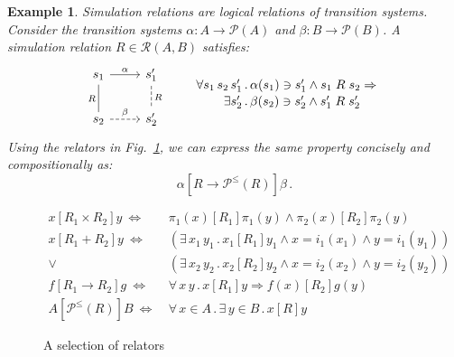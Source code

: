 \documentclass[draft,11pt]{report}
\newtheorem{example}{Example}
\newcommand{\ifr}[1]{\mathrel{[{#1}]}}
\newcommand{\figsize}{}
\begin{document}
\begin{example} \label{ex:simrel} %
Simulation relations are
logical relations of transition systems.
Consider the transition systems
$\alpha : A \rightarrow \mathcal{P}(A)$ and
$\beta : B \rightarrow \mathcal{P}(B)$.
A simulation relation $R \in \mathcal{R}(A, B)$
satisfies:
\[
  \begin{tikzcd}[scale=0.8]
    s_1 \arrow[r, "\alpha"]
        \arrow[d, dash, "R"'] &
    s_1' \arrow[d, dashed, dash, "R"] \\
    s_2 \arrow[r, dashed, "\beta"] &
    s_2'
  \end{tikzcd}
  \qquad
  \label{eqn:simrel}
  \begin{array}{r@{\,.\,}l}
    \forall s_1 \, s_2 \, s_1' &
      \alpha(s_1) \ni s_1' \wedge s_1 \mathrel{R} s_2 \Rightarrow
    \\[0.25ex]
    \exists s_2' &
      \beta(s_2) \ni s_2' \wedge s_1' \mathrel{R} s_2'
  \end{array}
\]
Using the relators in Fig.~\ref{fig:relators},
we can express the same property
concisely and compositionally as:
\[
  \alpha \ifr{R \rightarrow \mathcal{P}^\le(R)} \beta \,.
\]
\end{example}

\begin{figure} %
  \figsize
  \begin{align*}
    x \ifr{R_1 \times R_2} y \ \Leftrightarrow\  &
      \pi_1(x) \ifr{R_1} \pi_1(y) \wedge
      \pi_2(x) \ifr{R_2} \pi_2(y) \\
    x \ifr{R_1 + R_2} y \ \Leftrightarrow\  &
      (\exists \, x_1 \, y_1 \,.\,
        x_1 \ifr{R_1} y_1 \wedge
        x = i_1(x_1) \wedge
        y = i_1(y_1)) \\ \vee\ &
      (\exists \, x_2 \, y_2 \,.\,
        x_2 \ifr{R_2} y_2 \wedge
        x = i_2(x_2) \wedge
        y = i_2(y_2)) \\
    f \ifr{R_1 \rightarrow R_2} g \ \Leftrightarrow\  &
      \forall \, x \, y \,.\,
        x \ifr{R_1} y \Rightarrow
        f(x) \ifr{R_2} g(y) \\
    A \ifr{\mathcal{P}^\le(R)} B \ \Leftrightarrow\  &
      \forall \, x \in A \,.\,
      \exists \, y \in B \,.\,
      x \ifr{R} y
  \end{align*}
  \caption{A selection of relators}
  \label{fig:relators}
\end{figure}

\end{document}
